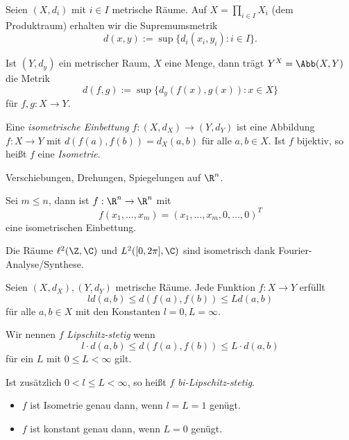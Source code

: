 \begin{ex}[Produkträume]
	Seien $(X,d_i)$ mit $i \in I$ metrische Räume.
	Auf $X = \prod_{i\in I} X_i$ (dem Produktraum) erhalten wir die Supremumsmetrik
	\[
		d(x,y) := \sup \{ d_i(x_i,y_i) : i \in I \}.
	\]
\end{ex}

\begin{ex}[Abbildungsräume]
	Ist $(Y,d_y)$ ein metrischer Raum, $X$ eine Menge, dann trägt $Y^X = \Abb(X,Y)$ die Metrik
	\[
		d(f,g) := \sup \{ d_y(f(x),g(x)) : x \in X \}
	\]
	für $f,g : X \to Y$.
\end{ex}

\begin{df}
	Eine \emph{isometrische Einbettung} $f:(X,d_X) \to (Y,d_Y)$ ist eine Abbildung $f: X\to Y$ mit $d(f(a), f(b)) = d_X(a,b)$ für alle $a,b \in X$.
	Ist $f$ bijektiv, so heißt $f$ eine \emph{Isometrie}.
\end{df}

\begin{ex}
	Verschiebungen, Drehungen, Spiegelungen auf $\R^n$.
\end{ex}

\begin{ex}
	Sei $m \le n$, dann ist	$f: \R^n \to \R^n$ mit
	\[
		f(x_1, \dotsc, x_m) = (x_1, \dotsc, x_m, 0, \dotsc, 0)^T
	\]
	eine isometrischen Einbettung.
\end{ex}

\begin{ex}
	Die Räume $\ell^2(\Z, \C)$ und $L^2([0,2\pi], \C)$ sind isometrisch dank Fourier-Analyse/Synthese.
\end{ex}

Seien $(X,d_X), (Y,d_Y)$ metrische Räume.
Jede Funktion $f : X \to Y$ erfüllt
\[
	l d(a,b) \le d(f(a), f(b)) \le L d(a,b)
\]
für alle $a,b \in X$ mit den Konstanten $l=0, L = \infty$.

\begin{df}
	Wir nennen $f$ \emph{Lipschitz-stetig} wenn
	\[
		l \cdot d(a,b) \le d(f(a), f(b)) \le L \cdot d(a,b)
	\]
	für ein $L$ mit $0 \le L < \infty$ gilt.

	Ist zusätzlich $0 < l \le L < \infty$, so heißt $f$ \emph{bi-Lipschitz-stetig}.
\end{df}

\begin{ex}
	\begin{itemize}
		\item
			$f$ ist Isometrie genau dann, wenn $l=L=1$ genügt.
		\item
			$f$ ist konstant genau dann, wenn $L=0$ genügt.
	\end{itemize}
\end{ex}

